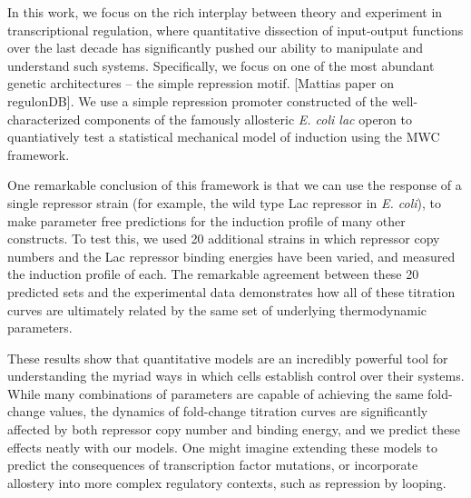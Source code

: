 %

In this work, we focus on the rich interplay between theory and experiment in
transcriptional regulation, where quantitative dissection of input-output
functions over the last decade has significantly pushed our ability to
manipulate and understand such systems. Specifically, we focus on one of the
most abundant genetic architectures -- the simple repression motif.
[Mattias paper on regulonDB]. We use a simple repression promoter constructed of the well-characterized components of the famously allosteric \textit{E. coli lac} operon to quantiatively test a statistical mechanical model of induction using the MWC framework.

One remarkable conclusion of this framework is that we can
use the response of a single repressor strain (for example, the wild type Lac
repressor in \textit{E. coli}), to make parameter free predictions for the
induction profile of many other constructs. To test this, we used 20
additional strains in which repressor copy numbers and the Lac repressor
binding energies have been varied, and measured the induction profile of each.
The remarkable agreement between these 20 predicted sets and the experimental
data demonstrates how all of these titration curves are ultimately related by
the same set of underlying thermodynamic parameters.

These results show that quantitative models are an incredibly powerful tool for
understanding the myriad ways in which cells establish control over their
systems. While many combinations of parameters are capable of achieving the same
fold-change values, the dynamics of fold-change titration curves are
significantly affected by both repressor copy number and binding energy, and we
predict these effects neatly with our models. One might imagine extending these
models to predict the consequences of transcription factor mutations, or
incorporate allostery into more complex regulatory contexts, such as repression
by looping.


